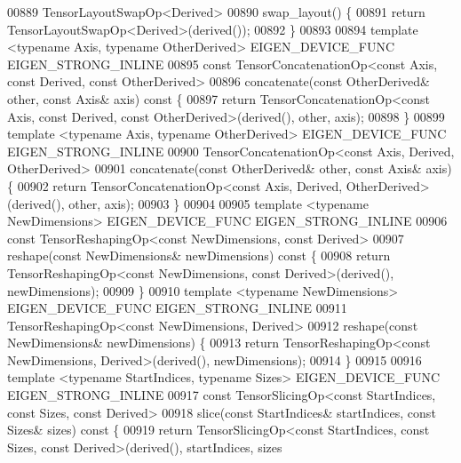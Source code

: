 \begin{DoxyCode}
00889     TensorLayoutSwapOp<Derived>
00890     swap\_layout() \{
00891       \textcolor{keywordflow}{return} TensorLayoutSwapOp<Derived>(derived());
00892     \}
00893 
00894     \textcolor{keyword}{template} <\textcolor{keyword}{typename} Axis, \textcolor{keyword}{typename} OtherDerived> EIGEN\_DEVICE\_FUNC EIGEN\_STRONG\_INLINE
00895     \textcolor{keyword}{const} TensorConcatenationOp<const Axis, const Derived, const OtherDerived>
00896     concatenate(\textcolor{keyword}{const} OtherDerived& other, \textcolor{keyword}{const} Axis& axis)\textcolor{keyword}{ const }\{
00897       \textcolor{keywordflow}{return} TensorConcatenationOp<const Axis, const Derived, const OtherDerived>(derived(), other, axis);
00898     \}
00899     \textcolor{keyword}{template} <\textcolor{keyword}{typename} Axis, \textcolor{keyword}{typename} OtherDerived> EIGEN\_DEVICE\_FUNC EIGEN\_STRONG\_INLINE
00900     TensorConcatenationOp<const Axis, Derived, OtherDerived>
00901     concatenate(\textcolor{keyword}{const} OtherDerived& other, \textcolor{keyword}{const} Axis& axis) \{
00902       \textcolor{keywordflow}{return} TensorConcatenationOp<const Axis, Derived, OtherDerived>(derived(), other, axis);
00903     \}
00904 
00905     \textcolor{keyword}{template} <\textcolor{keyword}{typename} NewDimensions> EIGEN\_DEVICE\_FUNC EIGEN\_STRONG\_INLINE
00906     \textcolor{keyword}{const} TensorReshapingOp<const NewDimensions, const Derived>
00907     reshape(\textcolor{keyword}{const} NewDimensions& newDimensions)\textcolor{keyword}{ const }\{
00908       \textcolor{keywordflow}{return} TensorReshapingOp<const NewDimensions, const Derived>(derived(), newDimensions);
00909     \}
00910     \textcolor{keyword}{template} <\textcolor{keyword}{typename} NewDimensions> EIGEN\_DEVICE\_FUNC EIGEN\_STRONG\_INLINE
00911     TensorReshapingOp<const NewDimensions, Derived>
00912     reshape(\textcolor{keyword}{const} NewDimensions& newDimensions) \{
00913       \textcolor{keywordflow}{return} TensorReshapingOp<const NewDimensions, Derived>(derived(), newDimensions);
00914     \}
00915 
00916     \textcolor{keyword}{template} <\textcolor{keyword}{typename} StartIndices, \textcolor{keyword}{typename} Sizes> EIGEN\_DEVICE\_FUNC EIGEN\_STRONG\_INLINE
00917     \textcolor{keyword}{const} TensorSlicingOp<const StartIndices, const Sizes, const Derived>
00918     slice(\textcolor{keyword}{const} StartIndices& startIndices, \textcolor{keyword}{const} Sizes& sizes)\textcolor{keyword}{ const }\{
00919       \textcolor{keywordflow}{return} TensorSlicingOp<const StartIndices, const Sizes, const Derived>(derived(), startIndices, sizes

\end{DoxyCode}
